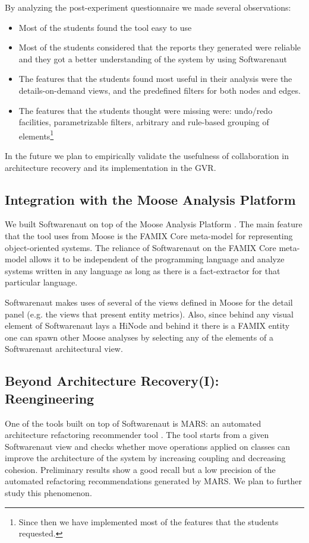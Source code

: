 \documentclass[preprint,12pt]{elsarticle}
\begin{document}
By analyzing the post-experiment questionnaire we made several observations:

\begin{itemize}
\item Most of the students found the tool easy to use 
\item Most of the students considered that the reports they generated were reliable and they got a better understanding of the system by using Softwarenaut
\item The features that the students found most useful in their analysis were the details-on-demand views, and the predefined filters for both nodes and edges.
\item The features that the students thought were missing were: undo/redo facilities, parametrizable filters, arbitrary and rule-based grouping of elements\footnote{Since then we have implemented most of the features that the students requested.}
\end{itemize}

In the future we plan to empirically validate the usefulness of collaboration in architecture recovery and its implementation in the GVR.


\subsection {Integration with the Moose Analysis Platform}
We built Softwarenaut on top of the Moose Analysis Platform \cite{nier-story}. The main feature that the tool uses from Moose is the FAMIX Core meta-model for representing object-oriented systems. The reliance of Softwarenaut on the FAMIX Core meta-model allows it to be independent of the programming language and analyze systems written in any language as long as there is a fact-extractor for that particular language. 

Softwarenaut makes uses of several of the views defined in Moose for the detail panel (e.g. the views that present entity metrics). Also, since behind any visual element of Softwarenaut lays a HiNode and behind it there is a FAMIX entity one can spawn other Moose analyses by selecting any of the elements of a Softwarenaut architectural view. 



\subsection {Beyond Architecture Recovery(I): Reengineering}
One of the tools built on top of Softwarenaut is MARS: an automated architecture refactoring recommender tool \cite{boeckmann-mars}. The tool starts from a given Softwarenaut view and checks whether move operations applied on classes can improve the architecture of the system by increasing coupling and decreasing cohesion. Preliminary results show a good recall but a low precision of the  automated refactoring recommendations generated by MARS. We plan to further study this phenomenon.
\end{document}
